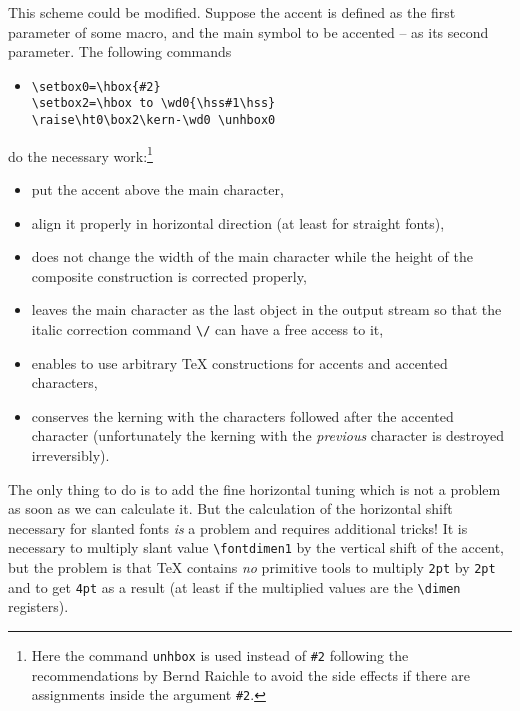 This scheme could be modified. Suppose the accent is defined as the first
parameter of some macro, and the main symbol to be accented -- as its
second parameter. The following commands
\begin{itemize}
\item[]\begin{verbatim}
\setbox0=\hbox{#2}
\setbox2=\hbox to \wd0{\hss#1\hss}
\raise\ht0\box2\kern-\wd0 \unhbox0
\end{verbatim}
\end{itemize}
do the necessary work:\footnote{Here the command {\tt\bs{}unhbox}
is used instead of {\tt\#2} following the recommendations
by Bernd Raichle to avoid the side effects if there are
assignments inside the argument {\tt\#2}.}
\begin{itemize}
\item put the accent above the main character,
\item align it properly in horizontal direction
      (at least for straight fonts),
\item does not change the width of the
      main character while the height of the composite construction
      is corrected properly,
\item leaves the main character as the last object in the output stream
      so that the italic correction command \verb?\/? can have a free
      access to it,
\item enables to use arbitrary \TeX{} constructions for accents and
      accented characters,
\item conserves the kerning with the characters followed after
      the accented character (unfortunately the kerning with the
      {\em previous} character is destroyed irreversibly).
\end{itemize}

The only thing to do is to add the fine horizontal tuning
which is not a problem as soon as we can calculate it.
But the calculation of the horizontal shift necessary
for slanted fonts {\em is} a problem and requires additional
tricks! It is necessary to multiply slant value \verb?\fontdimen1?
by the vertical shift of the accent,
but the problem is that \TeX{} contains {\em no} primitive
tools to multiply {\tt 2pt} by {\tt 2pt} and to get
{\tt 4pt} as a result (at least if the multiplied values
are the \verb?\dimen? registers).

